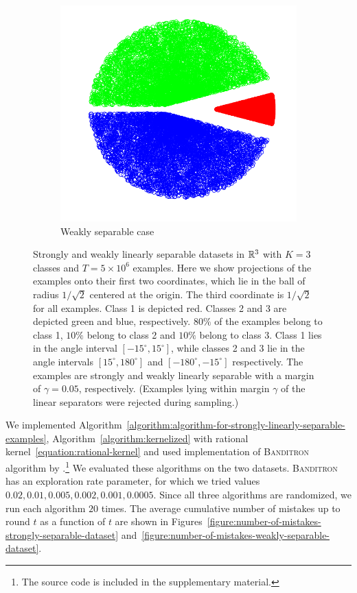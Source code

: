 \begin{figure}[h]
\begin{subfigure}[b]{0.3\textwidth}
\includegraphics[width=\textwidth, trim={0, 0cm, 0, 0}, clip]{figures/weak_points.pdf}
\caption{Weakly separable case}
\label{figure:weakly-separable-dataset}
\end{subfigure}
\caption{Strongly and weakly linearly separable datasets in $\mathbb{R}^3$ with $K=3$
classes and $T=5\times 10^6$ examples. Here we show projections of the examples
onto their first two coordinates, which lie in the ball of radius $1/\sqrt{2}$
centered at the origin. The third coordinate is $1/\sqrt{2}$ for all examples.
Class 1 is depicted red. Classes 2 and 3 are depicted green and blue,
respectively. $80\%$ of the examples belong to class 1, $10\%$ belong to class 2
and $10\%$ belong to class 3. Class 1 lies in the angle interval $[-15^\circ,
15^\circ]$, while classes 2 and 3 lie in the angle intervals $[15^\circ,
180^\circ]$ and $[-180^\circ, -15^\circ]$ respectively. The examples are
strongly and weakly linearly separable with a margin of $\gamma=0.05$,
respectively. (Examples lying within margin $\gamma$ of the linear separators
were rejected during sampling.)}
\label{figure:strongly-and-weakly-separable-datasets}
\end{figure}

We implemented
Algorithm~\ref{algorithm:algorithm-for-strongly-linearly-separable-examples},
Algorithm~\ref{algorithm:kernelized} with rational
kernel~\eqref{equation:rational-kernel} and used implementation of
\textsc{Banditron} algorithm by \citet{Orabona09}.\footnote{The source code
is included in the supplementary material.}
We evaluated these algorithms on the two datasets. \textsc{Banditron} has an
exploration rate parameter, for which we tried values $0.02, 0.01, 0.005, 0.002,
0.001, 0.0005$. Since all three algorithms are randomized, we run each algorithm
$20$ times. The average cumulative number of mistakes up to round $t$ as a
function of $t$ are shown in
Figures~\ref{figure:number-of-mistakes-strongly-separable-dataset}
and~\ref{figure:number-of-mistakes-weakly-separable-dataset}.

